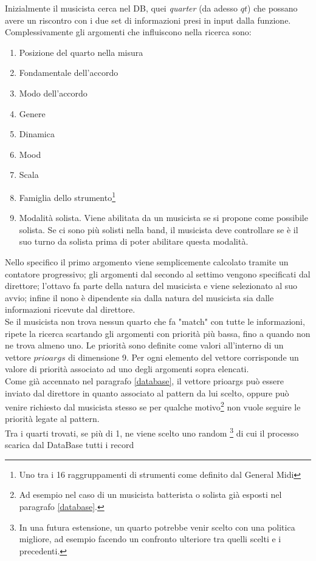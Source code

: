 Inizialmente il musicista cerca nel DB, quei \emph{quarter} (da adesso
$qt$) che possano
avere un riscontro con i due set di informazioni presi in input dalla
funzione. Complessivamente gli argomenti che influiscono nella ricerca
sono:
\begin{enumerate}
\item Posizione del quarto nella misura
\item Fondamentale dell'accordo
\item Modo dell'accordo
\item Genere
\item Dinamica
\item Mood
\item Scala
\item Famiglia dello strumento\footnote{Uno tra i 16 raggruppamenti
di strumenti come definito dal General
Midi\cite{generalmidi}}
\item Modalità solista. Viene abilitata da un musicista se si propone come
possibile solista. Se ci sono più solisti nella band, il musicista deve
controllare se è il suo turno da solista prima di poter abilitare questa
modalità.
\end{enumerate}
Nello specifico il primo argomento viene semplicemente calcolato tramite un
contatore progressivo; gli argomenti dal secondo al settimo vengono
specificati dal direttore; l'ottavo fa parte della natura del musicista
e viene selezionato al suo avvio; infine il nono è dipendente sia dalla
natura del musicista sia dalle informazioni ricevute dal direttore.\\
Se il musicista non trova nessun quarto che fa "match" con tutte le
informazioni, ripete la ricerca scartando
gli argomenti con priorità più bassa, fino a quando non ne trova almeno
uno. Le priorità sono definite come valori all'interno di un vettore
$prioargs$ di dimensione 9. Per ogni elemento del vettore corrisponde un valore di priorità
associato ad uno degli argomenti sopra elencati.\\
Come già accennato nel paragrafo \ref{database}, il vettore prioargs può
essere inviato dal direttore in quanto associato al pattern da lui
scelto, oppure può venire richiesto dal musicista
stesso se per qualche motivo\footnote{Ad esempio nel caso di un
musicista batterista o solista già esposti nel paragrafo \ref{database}.} 
non vuole seguire le priorità legate al pattern.\\
Tra i quarti trovati, se più di 1, ne viene scelto uno random
\footnote{In una futura estensione, un quarto potrebbe venir scelto con
una politica migliore, ad esempio facendo un confronto ulteriore tra quelli
scelti e i precedenti.} di cui il processo scarica dal DataBase tutti i record
